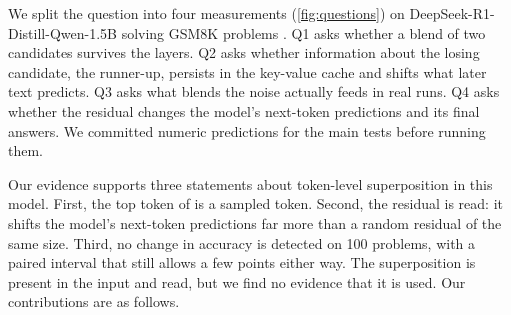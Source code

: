 We split the question into four measurements (\cref{fig:questions}) on DeepSeek-R1-Distill-Qwen-1.5B %
\cite{deepseekai2025r1,guo2025nature} solving GSM8K problems \cite{cobbe2021gsm8k}.
Q1 asks whether a blend of two candidates survives the layers.
Q2 asks whether information about the losing candidate, the runner-up, persists in the key-value cache and shifts
what later text predicts.
Q3 asks what blends the noise actually feeds in real runs.
Q4 asks whether the residual changes the model's next-token predictions and its final answers.
We committed numeric predictions for the main tests before running them.

Our evidence supports three statements about token-level superposition in this model.
First, the top token of \GST{} is a sampled token.
Second, the residual is read: it shifts the model's next-token predictions far more than a random residual of the
same size.
Third, no change in accuracy is detected on 100 problems, with a paired interval that still allows a few points %
either way.
The superposition is present in the input and read, but we find no evidence that it is used.
Our contributions are as follows.
